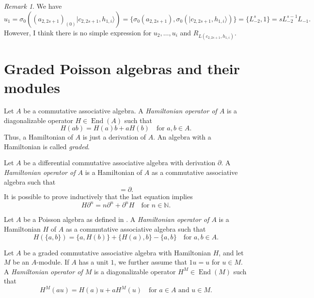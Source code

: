 \documentclass[a4paper, 12pt, reqno]{amsart}
\theoremstyle{remark}
\newtheorem{remark}[theorem]{Remark}
\DeclareMathOperator{\End}{End}
\begin{document}
\begin{remark}
  \label{rmk:3}
  We have
  \begin{equation*}
    u_1 = \sigma_0((a_{2, 2s + 1})_{(0)}|c_{2, 2s + 1}, h_{1, i}\rangle) = \{\sigma_0(a_{2, 2s + 1}), \sigma_0(|c_{2, 2s + 1}, h_{1, i}\rangle)\} = \{L_{-2}^s, 1\} = sL_{-2}^{s - 1}L_{-1}.
  \end{equation*}
  However, I think there is no simple expression for $u_2, \dots, u_i$ and $R_{L(c_{2, 2s + 1}, h_{1, i})}$.
\end{remark}

\appendix
\section{Graded Poisson algebras and their modules}
\label{sec:grad-poiss-algeb}

Let $A$ be a commutative associative algebra.
A \emph{Hamiltonian operator of $A$} is a diagonalizable operator $H \in \End(A)$ such that
\begin{equation*}
  H(ab) = H(a)b + aH(b) \quad \text{for $a, b \in A$}.
\end{equation*}
Thus, a Hamiltonian of $A$ is just a derivation of $A$.
An algebra with a Hamiltonian is called \emph{graded}.

Let $A$ be a differential commutative associative algebra with derivation $\partial$.
A \emph{Hamiltonian operator of $A$} is a Hamiltonian of $A$ as a commutative associative algebra such that
\begin{equation*}
  [H, \partial] = \partial.
\end{equation*}
It is possible to prove inductively that the last equation implies
\begin{equation}
  \label{eq:16}
  H\partial^n = n\partial^n + \partial^nH \quad \text{for $n \in \mathbb{N}$}.
\end{equation}

Let $A$ be a Poisson algebra as defined in \cite{caressa_examples_2003}.
A \emph{Hamiltonian operator of $A$} is a Hamiltonian $H$ of $A$ as a commutative associative algebra such that
\begin{equation*}
  H(\{a, b\}) = \{a, H(b)\} + \{H(a), b\} - \{a, b\} \quad \text{for $a, b \in A$}.
\end{equation*}

Let $A$ be a graded commutative associative algebra with Hamiltonian $H$, and let $M$ be an $A$-module.
If $A$ has a unit $1$, we further assume that $1u = u$ for $u \in M$.
A \emph{Hamiltonian operator of $M$} is a diagonalizable operator $H^M \in \End(M)$ such that
\begin{equation*}
  H^M(au) = H(a)u + aH^M(u) \quad \text{for $a \in A$ and $u \in M$}.
\end{equation*}
\end{document}
